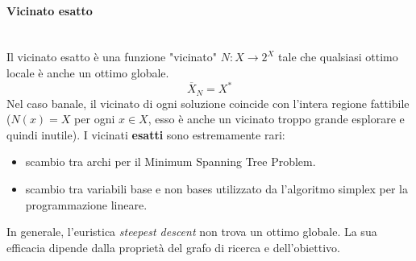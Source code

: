 \documentclass{article}
\begin{document}
\paragraph{Vicinato esatto}\mbox{}\\
Il vicinato esatto è una funzione "vicinato" $N:X\rightarrow 2^X$ tale che qualsiasi ottimo locale è anche un
ottimo globale.
$$\overline{X}_N=X^*$$
Nel caso banale, il vicinato di ogni soluzione coincide con l'intera regione fattibile ($N(x)=X$ per ogni $x\in X$,
esso è anche un vicinato troppo grande esplorare e quindi inutile).
I vicinati \textbf{esatti} sono estremamente rari:
\begin{itemize}
    \item scambio tra archi per il Minimum Spanning Tree Problem.
    \item scambio tra variabili base e non bases utilizzato da l'algoritmo simplex per la programmazione lineare.
\end{itemize}
In generale, l'euristica \textit{steepest descent} non trova un ottimo globale. La sua efficacia dipende dalla
proprietà del grafo di ricerca e dell'obiettivo.
\end{document}
